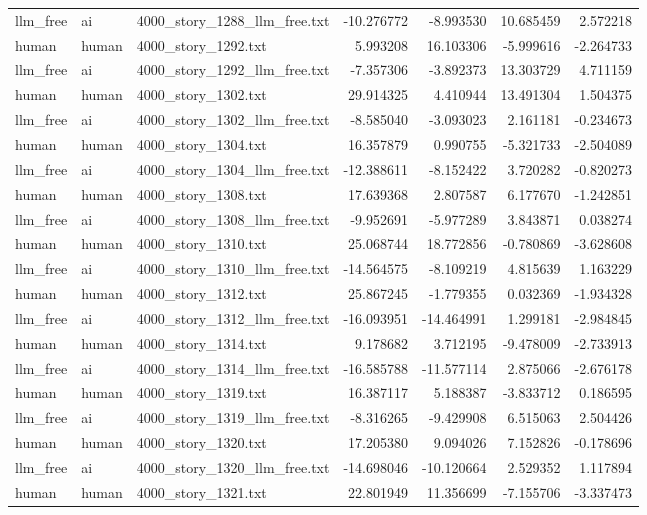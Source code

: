 \begin{longtable}{lllrrrr}
llm\_free & ai & 4000\_story\_1288\_llm\_free.txt & -10.276772 & -8.993530 & 10.685459 & 2.572218 \\
human & human & 4000\_story\_1292.txt & 5.993208 & 16.103306 & -5.999616 & -2.264733 \\
llm\_free & ai & 4000\_story\_1292\_llm\_free.txt & -7.357306 & -3.892373 & 13.303729 & 4.711159 \\
human & human & 4000\_story\_1302.txt & 29.914325 & 4.410944 & 13.491304 & 1.504375 \\
llm\_free & ai & 4000\_story\_1302\_llm\_free.txt & -8.585040 & -3.093023 & 2.161181 & -0.234673 \\
human & human & 4000\_story\_1304.txt & 16.357879 & 0.990755 & -5.321733 & -2.504089 \\
llm\_free & ai & 4000\_story\_1304\_llm\_free.txt & -12.388611 & -8.152422 & 3.720282 & -0.820273 \\
human & human & 4000\_story\_1308.txt & 17.639368 & 2.807587 & 6.177670 & -1.242851 \\
llm\_free & ai & 4000\_story\_1308\_llm\_free.txt & -9.952691 & -5.977289 & 3.843871 & 0.038274 \\
human & human & 4000\_story\_1310.txt & 25.068744 & 18.772856 & -0.780869 & -3.628608 \\
llm\_free & ai & 4000\_story\_1310\_llm\_free.txt & -14.564575 & -8.109219 & 4.815639 & 1.163229 \\
human & human & 4000\_story\_1312.txt & 25.867245 & -1.779355 & 0.032369 & -1.934328 \\
llm\_free & ai & 4000\_story\_1312\_llm\_free.txt & -16.093951 & -14.464991 & 1.299181 & -2.984845 \\
human & human & 4000\_story\_1314.txt & 9.178682 & 3.712195 & -9.478009 & -2.733913 \\
llm\_free & ai & 4000\_story\_1314\_llm\_free.txt & -16.585788 & -11.577114 & 2.875066 & -2.676178 \\
human & human & 4000\_story\_1319.txt & 16.387117 & 5.188387 & -3.833712 & 0.186595 \\
llm\_free & ai & 4000\_story\_1319\_llm\_free.txt & -8.316265 & -9.429908 & 6.515063 & 2.504426 \\
human & human & 4000\_story\_1320.txt & 17.205380 & 9.094026 & 7.152826 & -0.178696 \\
llm\_free & ai & 4000\_story\_1320\_llm\_free.txt & -14.698046 & -10.120664 & 2.529352 & 1.117894 \\
human & human & 4000\_story\_1321.txt & 22.801949 & 11.356699 & -7.155706 & -3.337473 \\

\end{longtable}
